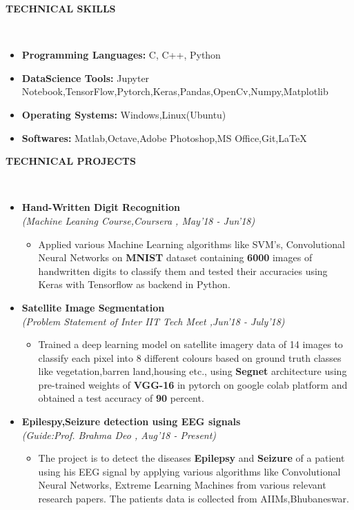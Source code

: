 \documentclass[a4paper,10pt]{article}
\newcommand{\isep}{-2 pt}
\newcommand{\lsep}{-0.5cm}
\newcommand{\resheading}[1]{{\small \colorbox{mygrey}{\begin{minipage}{0.975\textwidth}{\textbf{#1 \vphantom{p\^{E}}}}\end{minipage}}}}
\begin{document}
\resheading{\textbf{TECHNICAL SKILLS} }\\[\lsep]
\begin{itemize}
\item \noindent \textbf{Programming Languages:} C, C++, Python\item \noindent \textbf{DataScience Tools:} Jupyter Notebook,TensorFlow,Pytorch,Keras,Pandas,OpenCv,Numpy,Matplotlib 
\item \noindent \textbf{Operating Systems:} Windows,Linux(Ubuntu)
\item \noindent \textbf{Softwares:} Matlab,Octave,Adobe Photoshop,MS Office,Git,\LaTeX{}
\end{itemize}

\resheading{\textbf{TECHNICAL PROJECTS} }\\[\lsep]
\begin{itemize}
\item \textbf{Hand-Written Digit Recognition}\\
 \emph{(Machine Leaning Course,Coursera
, May'18 - Jun'18)} \\[-0.6cm]
	\begin{itemize}\itemsep \isep
	\item Applied various Machine Learning algorithms like SVM's, Convolutional Neural Networks on \textbf{MNIST} dataset containing \textbf{6000} images of handwritten digits to classify them and tested their accuracies using Keras with Tensorflow as backend in Python.
	\end{itemize}

\item \textbf{Satellite Image Segmentation}\\
 \emph{(Problem Statement of Inter IIT Tech Meet
 ,Jun'18 - July'18)} \\[-0.6cm]
	\begin{itemize}\itemsep \isep
	\item Trained a deep learning model on satellite imagery data of 14 images to classify each pixel into 8 different colours based on ground truth classes like vegetation,barren land,housing etc., using \textbf{Segnet} architecture using pre-trained weights of \textbf{VGG-16} in pytorch on google colab platform and obtained a test accuracy of \textbf{90} percent.
	\end{itemize}

\item \textbf{Epilespy,Seizure detection using EEG signals}\\
 \emph{(Guide:Prof. Brahma Deo
, Aug'18 - Present)} \\[-0.6cm]
	\begin{itemize}\itemsep \isep
	\item The project is to detect the diseases \textbf{Epilepsy} and \textbf{Seizure} of a patient using his EEG signal by applying various algorithms  like Convolutional Neural Networks, Extreme Learning Machines from various relevant research papers. The patients data is collected from AIIMs,Bhubaneswar.
	\end{itemize}
	

\end{itemize}
\end{document}
